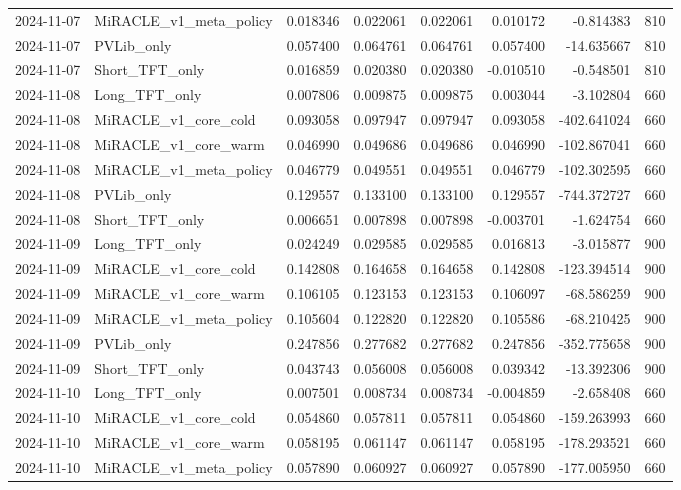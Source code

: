 \begin{tabular}{llrrrrrr}
2024-11-07 & MiRACLE_v1_meta_policy & 0.018346 & 0.022061 & 0.022061 & 0.010172 & -0.814383 & 810 \\
2024-11-07 & PVLib_only & 0.057400 & 0.064761 & 0.064761 & 0.057400 & -14.635667 & 810 \\
2024-11-07 & Short_TFT_only & 0.016859 & 0.020380 & 0.020380 & -0.010510 & -0.548501 & 810 \\
2024-11-08 & Long_TFT_only & 0.007806 & 0.009875 & 0.009875 & 0.003044 & -3.102804 & 660 \\
2024-11-08 & MiRACLE_v1_core_cold & 0.093058 & 0.097947 & 0.097947 & 0.093058 & -402.641024 & 660 \\
2024-11-08 & MiRACLE_v1_core_warm & 0.046990 & 0.049686 & 0.049686 & 0.046990 & -102.867041 & 660 \\
2024-11-08 & MiRACLE_v1_meta_policy & 0.046779 & 0.049551 & 0.049551 & 0.046779 & -102.302595 & 660 \\
2024-11-08 & PVLib_only & 0.129557 & 0.133100 & 0.133100 & 0.129557 & -744.372727 & 660 \\
2024-11-08 & Short_TFT_only & 0.006651 & 0.007898 & 0.007898 & -0.003701 & -1.624754 & 660 \\
2024-11-09 & Long_TFT_only & 0.024249 & 0.029585 & 0.029585 & 0.016813 & -3.015877 & 900 \\
2024-11-09 & MiRACLE_v1_core_cold & 0.142808 & 0.164658 & 0.164658 & 0.142808 & -123.394514 & 900 \\
2024-11-09 & MiRACLE_v1_core_warm & 0.106105 & 0.123153 & 0.123153 & 0.106097 & -68.586259 & 900 \\
2024-11-09 & MiRACLE_v1_meta_policy & 0.105604 & 0.122820 & 0.122820 & 0.105586 & -68.210425 & 900 \\
2024-11-09 & PVLib_only & 0.247856 & 0.277682 & 0.277682 & 0.247856 & -352.775658 & 900 \\
2024-11-09 & Short_TFT_only & 0.043743 & 0.056008 & 0.056008 & 0.039342 & -13.392306 & 900 \\
2024-11-10 & Long_TFT_only & 0.007501 & 0.008734 & 0.008734 & -0.004859 & -2.658408 & 660 \\
2024-11-10 & MiRACLE_v1_core_cold & 0.054860 & 0.057811 & 0.057811 & 0.054860 & -159.263993 & 660 \\
2024-11-10 & MiRACLE_v1_core_warm & 0.058195 & 0.061147 & 0.061147 & 0.058195 & -178.293521 & 660 \\
2024-11-10 & MiRACLE_v1_meta_policy & 0.057890 & 0.060927 & 0.060927 & 0.057890 & -177.005950 & 660 \\

\end{tabular}
